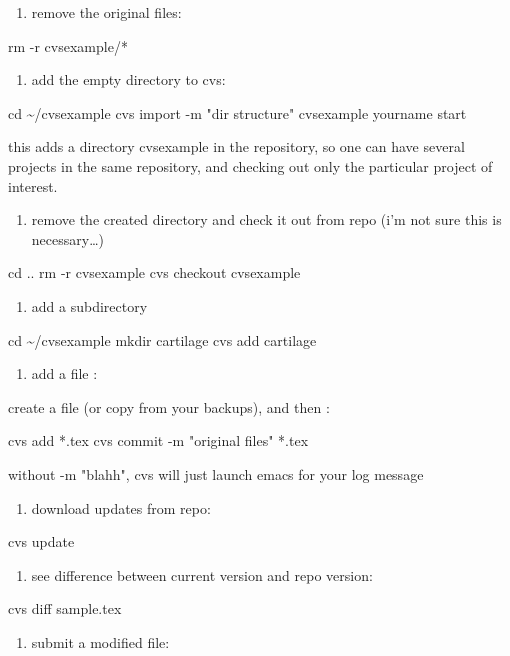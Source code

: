 \documentclass[11pt]{article}
\begin{document}
\begin{enumerate}
\item remove the original files:
\end{enumerate}
rm -r cvsexample/*

\begin{enumerate}
\item add the empty directory to cvs:
\end{enumerate}
cd \textasciitilde{}/cvsexample
cvs import -m "dir structure" cvsexample yourname start

this adds a directory cvsexample in the repository, so one can have several projects in the same repository, and checking out only the particular project of interest.

\begin{enumerate}
\item remove the created directory and check it out from repo (i'm not sure this is necessary\ldots{})
\end{enumerate}
cd ..
rm -r cvsexample
cvs checkout cvsexample

\begin{enumerate}
\item add a subdirectory
\end{enumerate}
cd \textasciitilde{}/cvsexample
mkdir cartilage
cvs add cartilage

\begin{enumerate}
\item add a file :
\end{enumerate}
create a file (or copy from your backups), and then :

cvs add *.tex
cvs commit -m "original files" *.tex

without -m "blahh", cvs will just launch emacs for your log message

\begin{enumerate}
\item download updates from repo:
\end{enumerate}
cvs update

\begin{enumerate}
\item see difference between current version and repo version:
\end{enumerate}
cvs diff sample.tex

\begin{enumerate}
\item submit a modified file:
\end{enumerate}
\end{document}
